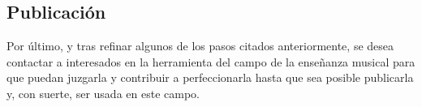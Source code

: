 \subsection{Publicación}
\label{subsec:releasing}
Por último, y tras refinar algunos de los pasos citados anteriormente, se desea contactar a interesados en la herramienta del campo de la enseñanza musical para que puedan juzgarla y contribuir a perfeccionarla hasta que sea posible publicarla y, con suerte, ser usada en este campo.